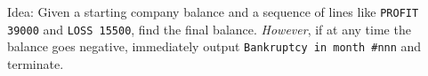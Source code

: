 

Idea: Given a starting company balance and a sequence of lines like \texttt{PROFIT 39000}
and \texttt{LOSS 15500}, find the final balance. \emph{However}, if at any time the
balance goes negative, immediately output \texttt{Bankruptcy in month \#nnn} and terminate.

